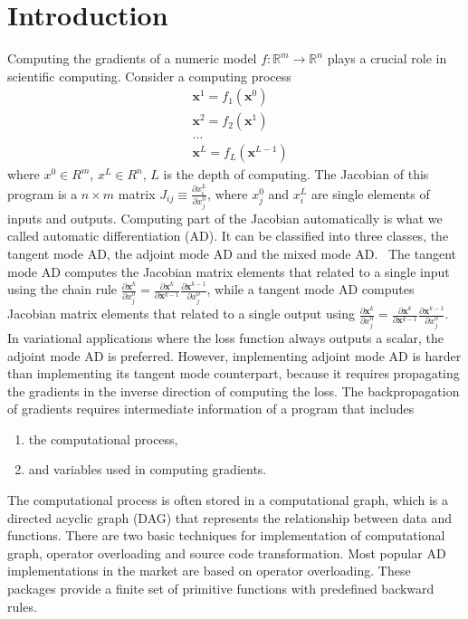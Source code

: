 \documentclass[aps,twocolumn,longbibliography,english,superscriptaddress]{revtex4-1}
\newcommand{\<}{\langle}
\renewcommand{\>}{\rangle}
\newcommand{\vx}{{\mathbf{x}}}
\theoremstyle{definition}\newtheorem{definition}{\textit{Definition}}
\begin{document}
\section{Introduction}\label{sec:intro}
    Computing the gradients of a numeric model $f : \mathbb{R}^m \rightarrow \mathbb{R}^n$ plays a crucial role in scientific computing. Consider a computing process
\begin{align*}
    &\vx^1 = f_1(\vx^0)\\
    &\vx^2 = f_2(\vx^1)\\
    &\ldots\\
    &\vx^L = f_L(\vx^{L-1})
\end{align*}
where $x^0\in R^m$, $x^L\in R^n$, $L$ is the depth of computing.
The Jacobian of this program is a $n\times m$ matrix $J_{ij} \equiv \frac{\partial x^L_i}{\partial x_j^0}$, where $x_j^0$ and $x_i^L$ are single elements of inputs and outputs.
Computing part of the Jacobian automatically is what we called automatic differentiation (AD). It can be classified into three classes, the tangent mode AD, the adjoint mode AD and the mixed mode AD.~\cite{Hascoet2013}
The tangent mode AD computes the Jacobian matrix elements that related to a single input using the chain rule $\frac{\partial \vx^k}{\partial x^0_j} = \frac{\partial \vx^k}{\partial \vx^{k-1}}\frac{\partial \vx^{k-1}}{\partial x^0_j}$, while a tangent mode AD computes Jacobian matrix elements that related to a single output using $\frac{\partial \vx^k}{\partial x^0_j} = \frac{\partial \vx^k}{\partial \vx^{k-1}}\frac{\partial \vx^{k-1}}{\partial x^0_j}$.
    In variational applications where the loss function always outputs a scalar, the adjoint mode AD is preferred.
However, implementing adjoint mode AD is harder than implementing its tangent mode counterpart, because it requires propagating the gradients in the inverse direction of computing the loss. The backpropagation of gradients requires intermediate information of a program that includes
\begin{enumerate}
    \item the computational process,
    \item and variables used in computing gradients.
\end{enumerate}
    The computational process is often stored in a computational graph, which is a directed acyclic graph (DAG) that represents the relationship between data and functions.
    There are two basic techniques for implementation of computational graph, operator overloading and source code transformation.
    Most popular AD implementations in the market are based on operator overloading. These packages provide a finite set of primitive functions with predefined backward rules.
\end{document}
